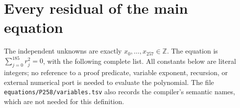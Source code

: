 \documentclass[11pt]{article}
\newcommand{\Z}{\mathbb Z}
\newcommand{\code}[1]{\texttt{\small #1}}
\begin{document}
\clearpage
\appendix
\section{Every residual of the main equation}\label{app:residuals}

The independent unknowns are exactly $x_0,\ldots,x_{257}\in\Z$.
The equation is $\sum_{j=0}^{185}r_j^2=0$, with the following complete
list. All constants below are literal integers; no reference to a proof
predicate, variable exponent, recursion, or external numerical port is
needed to evaluate the polynomial. The file
\code{equations/P258/variables.tsv} also records the compiler's semantic
names, which are not needed for this definition.

\begingroup\small
\setlength{\abovedisplayskip}{3pt}
\setlength{\belowdisplayskip}{3pt}
\setlength{\jot}{1pt}

\endgroup
\end{document}
